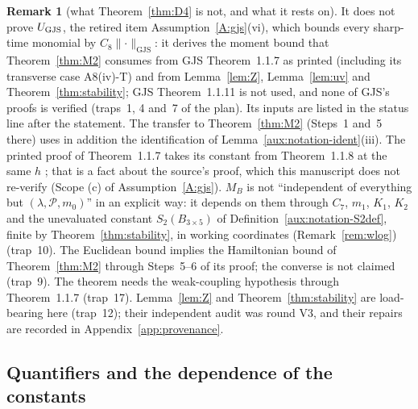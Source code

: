 \documentclass[11pt,a4paper]{article}
\theoremstyle{plain}
\theoremstyle{definition}
\theoremstyle{plain}
\theoremstyle{definition}
\newtheorem{auxrem}[auxlemma]{Remark}
\newcommand{\UGJS}{U_{\rm GJS}}
\newcommand{\GJS}[1]{\lVert #1\rVert_{\mathrm{GJS}}}   %
\begin{document}
\begin{auxrem}[what Theorem~\ref{thm:D4} is not, and what it rests on]\label{aux:d4-not}
It does not prove $\UGJS$, the retired item Assumption~\ref{A:gjs}(vi), which bounds every
sharp-time monomial by $C_8\GJS{\cdot}$: it derives the moment bound that
Theorem~\ref{thm:M2} consumes from GJS Theorem~1.1.7 as printed (including its transverse
case A8(iv)-T) and from Lemma~\ref{lem:Z}, Lemma~\ref{lem:uv} and Theorem~\ref{thm:stability};
GJS Theorem~1.1.11 is not used, and none of GJS's proofs is verified (traps~1, 4 and~7 of the
plan).  Its inputs are listed in the status line after the statement.  The transfer to
Theorem~\ref{thm:M2} (Steps~1 and~5 there) uses in addition the identification of
Lemma~\ref{aux:notation-ident}(iii).  The printed proof of Theorem~1.1.7 takes its constant
from Theorem~1.1.8 at the same $h$ \cite[p.~597]{GJS}; that is a fact about the source's
proof, which this manuscript does not re-verify (Scope (c) of Assumption~\ref{A:gjs}).  $M_B$
is not ``independent of everything but $(\lambda,\mathscr P,m_0)$'' in an explicit way: it
depends on them through $C_7$, $m_1$, $K_1$, $K_2$ and the unevaluated constant
$S_2(B_{3\times5})$ of Definition~\ref{aux:notation-S2def}, finite by
Theorem~\ref{thm:stability}, in working coordinates (Remark~\ref{rem:wlog}) (trap~10).  The
Euclidean bound implies the Hamiltonian bound of Theorem~\ref{thm:M2} through Steps~5--6 of
its proof; the converse is not claimed (trap~9).  The theorem needs the weak-coupling
hypothesis through Theorem~1.1.7 (trap~17).  Lemma~\ref{lem:Z} and Theorem~\ref{thm:stability}
are load-bearing here (trap~12); their independent audit was round V3, and their repairs are
recorded in Appendix~\ref{app:provenance}.
\end{auxrem}

\subsection{Quantifiers and the dependence of the constants}\label{sec:quant}
\end{document}
